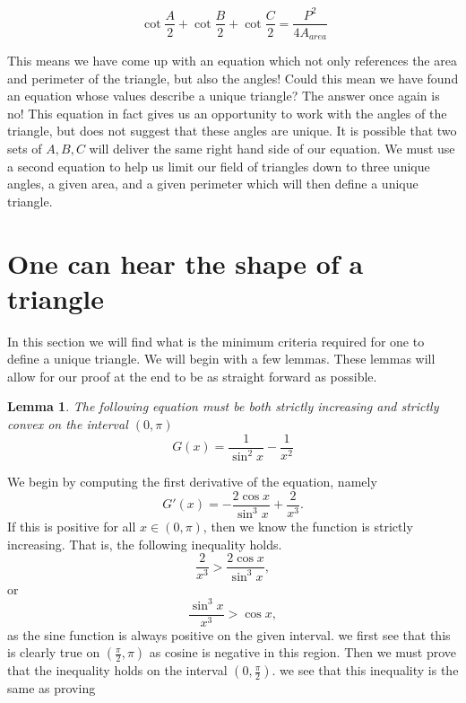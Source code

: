 \documentclass[12pt]{report}
\newtheorem{lemma}[theorem]{Lemma}
\numberwithin{definition}{section}
\begin{document}
\[\ \cot{\frac{A}{2}}+ \cot{\frac{B}{2}}+ \cot{\frac{C}{2}} = \frac{P^2}{4A_{area}}\]

	
	
	
	   
	 
	 
	 This means we have come up with an equation which not only references the area and perimeter of the triangle, but also the angles! Could this mean we have found an equation whose values describe a unique triangle? The answer once again is no! This equation in fact gives us an opportunity to work with the angles of the triangle, but does not suggest that these angles are unique. It is possible that two sets of $A,B, C$ will deliver the same right hand side of our equation. We must use a second equation to help us limit our field of triangles down to three unique angles, a given area, and a given perimeter which will then define a unique triangle. 
	 	
		
		
		
		
		
		 
\break









\section{One can hear the shape of a triangle}



 In this section we will find what is the minimum criteria required for one to define a unique triangle. We will begin with a few lemmas. These lemmas will allow for our proof at the end to be as straight forward as possible. 
 
\begin{lemma}\label{l1}
  The following equation must be both strictly increasing and strictly convex on the interval $(0, \pi)$
 \[G(x) = \frac{1}{\sin^2{x}}-\frac{1}{x^2}            \]
 \end{lemma}
 

 We begin by computing the first derivative of the equation, namely 
 \[G'(x) = -\frac{2 \cos {x}}{\sin^3{x}}+\frac{2}{x^3}.            \]
 If this is positive for all  $x \in (0, \pi)$, then we know the function is strictly increasing. 
 That is, the following inequality holds. 
 \[\frac{2}{x^3} >\frac{2 \cos {x}}{\sin^3{x}}, \]
 or 
 \[ \frac {\sin^3{x}}{x^3}>\cos{x}, \]
 as the sine function is always positive on the given interval. 
 we first see that this is clearly true on $(\frac{\pi}{2}, \pi)$ as cosine is negative in this region. Then we must prove that the inequality holds on the interval $(0, \frac{\pi}{2})$. 
 we see that this inequality is the same as proving 
 
\end{document}

